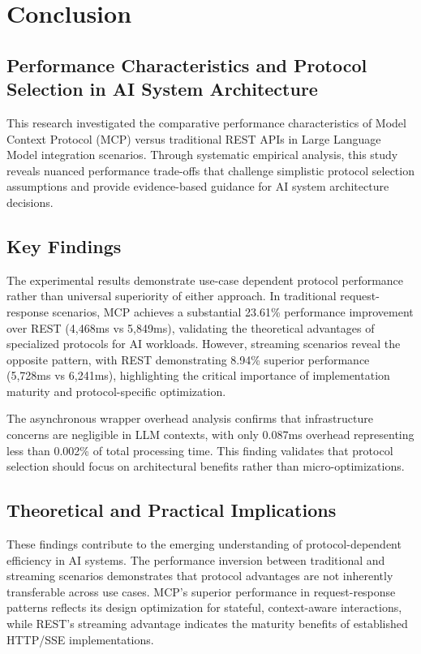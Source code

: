 
\chapter{Conclusion}

\section{Performance Characteristics and Protocol Selection in AI System Architecture}

This research investigated the comparative performance characteristics of Model Context Protocol (MCP) versus traditional REST APIs in Large Language Model integration scenarios. Through systematic empirical analysis, this study reveals nuanced performance trade-offs that challenge simplistic protocol selection assumptions and provide evidence-based guidance for AI system architecture decisions.

\section{Key Findings}

The experimental results demonstrate use-case dependent protocol performance rather than universal superiority of either approach. In traditional request-response scenarios, MCP achieves a substantial 23.61\% performance improvement over REST (4,468ms vs 5,849ms), validating the theoretical advantages of specialized protocols for AI workloads. However, streaming scenarios reveal the opposite pattern, with REST demonstrating 8.94\% superior performance (5,728ms vs 6,241ms), highlighting the critical importance of implementation maturity and protocol-specific optimization.

The asynchronous wrapper overhead analysis confirms that infrastructure concerns are negligible in LLM contexts, with only 0.087ms overhead representing less than 0.002\% of total processing time. This finding validates that protocol selection should focus on architectural benefits rather than micro-optimizations.

\section{Theoretical and Practical Implications}

These findings contribute to the emerging understanding of protocol-dependent efficiency in AI systems. The performance inversion between traditional and streaming scenarios demonstrates that protocol advantages are not inherently transferable across use cases. MCP's superior performance in request-response patterns reflects its design optimization for stateful, context-aware interactions, while REST's streaming advantage indicates the maturity benefits of established HTTP/SSE implementations.


